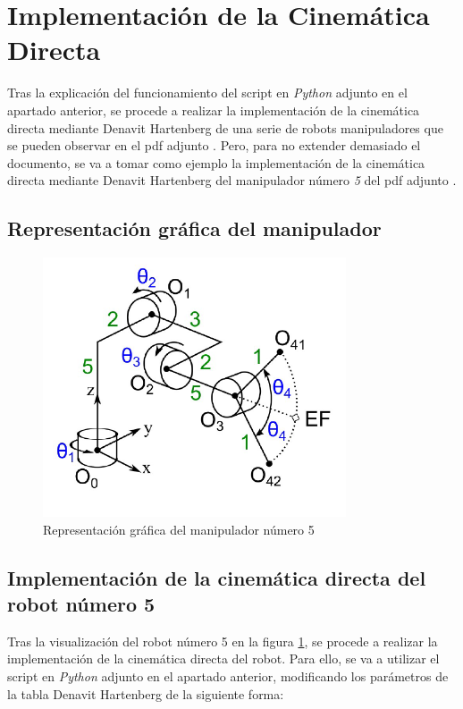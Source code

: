 \documentclass[11pt]{report}
\begin{document}
\section{Implementación de la Cinemática Directa}

Tras la explicación del funcionamiento del script en \emph{Python} adjunto en el apartado anterior, se procede a realizar la implementación de la cinemática directa mediante Denavit Hartenberg de una serie de robots manipuladores que se pueden observar en el pdf adjunto \cite{5}. Pero, para no extender demasiado el documento, se va a tomar como ejemplo la implementación de la cinemática directa mediante Denavit Hartenberg del manipulador número \emph{5} del pdf adjunto \cite{5}.

\subsection{Representación gráfica del manipulador}

\begin{figure}[H]
    \centering
    \includegraphics[width=0.8\textwidth]{src/img/Manipulador-5.png}
    \caption{Representación gráfica del manipulador número 5}
    \label{fig:robot5}
\end{figure}

\subsection{Implementación de la cinemática directa del robot número 5}

Tras la visualización del robot número 5 en la figura \ref{fig:robot5}, se procede a realizar la implementación de la cinemática directa del robot. Para ello, se va a utilizar el script en \emph{Python} adjunto en el apartado anterior, modificando los parámetros de la tabla Denavit Hartenberg de la siguiente forma:
\end{document}
